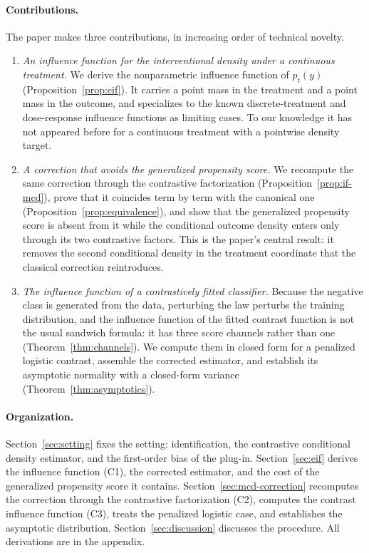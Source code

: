 \documentclass[11pt]{article}
\theoremstyle{plain}
\theoremstyle{definition}
\theoremstyle{remark}
\begin{document}
\paragraph{Contributions.}
The paper makes three contributions, in increasing order of technical novelty.
\begin{enumerate}
\item[(C1)] \emph{An influence function for the interventional density under a continuous
treatment.} We derive the nonparametric influence function of $p_t(y)$
(Proposition~\ref{prop:eif}). It carries a point mass in the treatment and a point mass in
the outcome, and specializes to the known discrete-treatment and dose-response influence
functions as limiting cases. To our knowledge it has not appeared before for a continuous
treatment with a pointwise density target.
\item[(C2)] \emph{A correction that avoids the generalized propensity score.} We recompute
the same correction through the contrastive factorization (Proposition~\ref{prop:if-mcd}),
prove that it coincides term by term with the canonical one
(Proposition~\ref{prop:equivalence}), and show that the generalized propensity score is
absent from it while the conditional outcome density enters only through its two
contrastive factors. This is the paper's central result: it removes the second
conditional density in the treatment coordinate that the classical correction reintroduces.
\item[(C3)] \emph{The influence function of a contrastively fitted classifier.} Because the
negative class is generated from the data, perturbing the law perturbs the training
distribution, and the influence function of the fitted contrast function is not the usual
sandwich formula: it has three score channels rather than one
(Theorem~\ref{thm:channels}). We compute them in closed form for a penalized logistic
contrast, assemble the corrected estimator, and establish its asymptotic normality with a
closed-form variance (Theorem~\ref{thm:asymptotics}).
\end{enumerate}

\paragraph{Organization.}
Section~\ref{sec:setting} fixes the setting: identification, the contrastive conditional
density estimator, and the first-order bias of the plug-in. Section~\ref{sec:eif} derives
the influence function (C1), the corrected estimator, and the cost of the generalized
propensity score it contains. Section~\ref{sec:mcd-correction} recomputes the correction
through the contrastive factorization (C2), computes the contrast influence function (C3),
treats the penalized logistic case, and establishes the asymptotic distribution.
Section~\ref{sec:discussion} discusses the procedure. All derivations are in the appendix.
\end{document}
